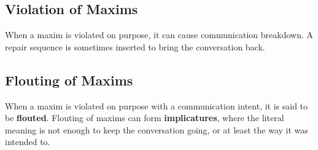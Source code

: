 \documentclass[../main.tex]{subfiles}
\begin{document}
		\subsection{Violation of Maxims}
		When a maxim is violated on purpose, it can cause communication breakdown. A repair sequence is sometimes inserted to bring the conversation back.

		\subsection{Flouting of Maxims}
		When a maxim is violated on purpose with a communication intent, it is said to be \textbf{flouted}. Flouting of maxims can form \textbf{implicatures}, where the literal meaning is not enough to keep the conversation going, or at least the way it was intended to.
\end{document}
